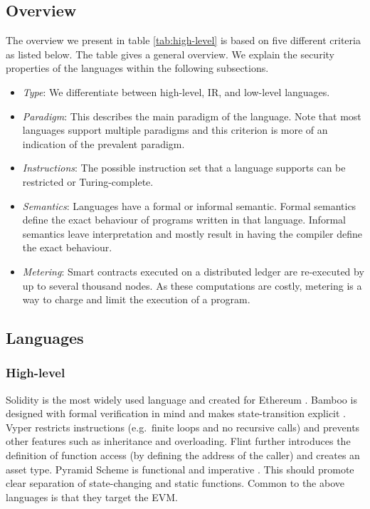\subsection{Overview}
The overview we present in table \ref{tab:high-level} is based on five different criteria as listed below. The table gives a general overview. We explain the security properties of the languages within the following subsections.
\begin{itemize}
\item \emph{Type}: We differentiate between high-level, IR, and low-level languages.
\item \emph{Paradigm}: This describes the main paradigm of the language. Note that most languages support multiple paradigms and this criterion is more of an indication of the prevalent paradigm.
\item \emph{Instructions}: The possible instruction set that a language supports can be restricted or Turing-complete.
\item \emph{Semantics}: Languages have a formal or informal semantic. Formal semantics define the exact behaviour of programs written in that language. Informal semantics leave interpretation and mostly result in having the compiler define the exact behaviour.
\item \emph{Metering}: Smart contracts executed on a distributed ledger are re-executed by up to several thousand nodes. As these computations are costly, metering is a way to charge and limit the execution of a program.
\end{itemize}



\subsection{Languages}

\subsubsection{High-level}
Solidity is the most widely used language and created for Ethereum \cite{Ethereum2018Solidity}.
Bamboo is designed with formal verification in mind and makes state-transition explicit \cite{Hirai2018Bamboo}. 
Vyper restricts instructions (e.g.\ finite loops and no recursive calls) and prevents other features such as inheritance and overloading\cite{Ethereum2018Vyper}. 
Flint further introduces the definition of function access (by defining the address of the caller) and creates an asset type. 
Pyramid Scheme is functional and imperative \cite{Burge2018}. This should promote clear separation of state-changing and static functions.
Common to the above languages is that they target the EVM.

